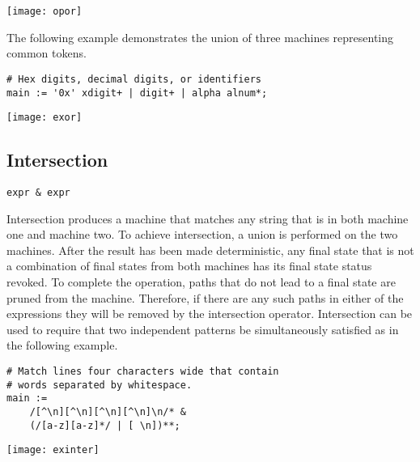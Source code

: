 \documentclass[letterpaper,11pt,oneside]{book}
\newcommand{\verbspace}{\vspace{10pt}}
\newcommand{\graphspace}{\vspace{10pt}}
\newenvironment{inline_code}{\def\baselinestretch{1}\vspace{12pt}\small}{}
\begin{document}
\graphspace
\begin{center}
\texttt{[image: opor]}
\end{center}
\graphspace

The following example demonstrates the union of three machines representing
common tokens.

\begin{inline_code}
\begin{verbatim}
# Hex digits, decimal digits, or identifiers
main := '0x' xdigit+ | digit+ | alpha alnum*;
\end{verbatim}
\end{inline_code}

\graphspace
\begin{center}
\texttt{[image: exor]}
\end{center}

\subsection{Intersection}

\verb|expr & expr|
\verbspace

Intersection produces a machine that matches any
string that is in both machine one and machine two. To achieve intersection, a
union is performed on the two machines. After the result has been made
deterministic, any final state that is not a combination of final states from
both machines has its final state status revoked. To complete the operation,
paths that do not lead to a final state are pruned from the machine. Therefore,
if there are any such paths in either of the expressions they will be removed
by the intersection operator.  Intersection can be used to require that two
independent patterns be simultaneously satisfied as in the following example.

\begin{inline_code}
\begin{verbatim}
# Match lines four characters wide that contain 
# words separated by whitespace.
main :=
    /[^\n][^\n][^\n][^\n]\n/* &
    (/[a-z][a-z]*/ | [ \n])**;
\end{verbatim}
\end{inline_code}

\graphspace
\begin{center}
\texttt{[image: exinter]}
\end{center}
\end{document}
